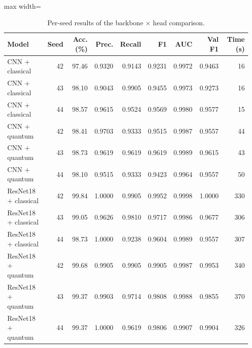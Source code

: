\begin{table}[htbp]
\centering
\scriptsize
\caption{Per-seed results of the backbone $\times$ head comparison.}
\label{tab:app_comparison_runs}
\begin{adjustbox}{max width=\linewidth}
\begin{tabular}{lrrrrrrrr}
\toprule
Model & Seed & Acc. (\%) & Prec. & Recall & F1 & AUC & Val F1 & Time (s) \\
\midrule
CNN + classical & 42 & 97.46 & 0.9320 & 0.9143 & 0.9231 & 0.9972 & 0.9463 & 16 \\
CNN + classical & 43 & 98.10 & 0.9043 & 0.9905 & 0.9455 & 0.9973 & 0.9273 & 16 \\
CNN + classical & 44 & 98.57 & 0.9615 & 0.9524 & 0.9569 & 0.9980 & 0.9577 & 15 \\
CNN + quantum & 42 & 98.41 & 0.9703 & 0.9333 & 0.9515 & 0.9987 & 0.9557 & 44 \\
CNN + quantum & 43 & 98.73 & 0.9619 & 0.9619 & 0.9619 & 0.9989 & 0.9615 & 43 \\
CNN + quantum & 44 & 98.10 & 0.9515 & 0.9333 & 0.9423 & 0.9964 & 0.9557 & 50 \\
ResNet18 + classical & 42 & 99.84 & 1.0000 & 0.9905 & 0.9952 & 0.9998 & 1.0000 & 330 \\
ResNet18 + classical & 43 & 99.05 & 0.9626 & 0.9810 & 0.9717 & 0.9986 & 0.9677 & 306 \\
ResNet18 + classical & 44 & 98.73 & 1.0000 & 0.9238 & 0.9604 & 0.9989 & 0.9557 & 307 \\
ResNet18 + quantum & 42 & 99.68 & 0.9905 & 0.9905 & 0.9905 & 0.9987 & 0.9953 & 340 \\
ResNet18 + quantum & 43 & 99.37 & 0.9903 & 0.9714 & 0.9808 & 0.9988 & 0.9855 & 370 \\
ResNet18 + quantum & 44 & 99.37 & 1.0000 & 0.9619 & 0.9806 & 0.9907 & 0.9904 & 326 \\
\bottomrule
\end{tabular}
\end{adjustbox}
\end{table}

